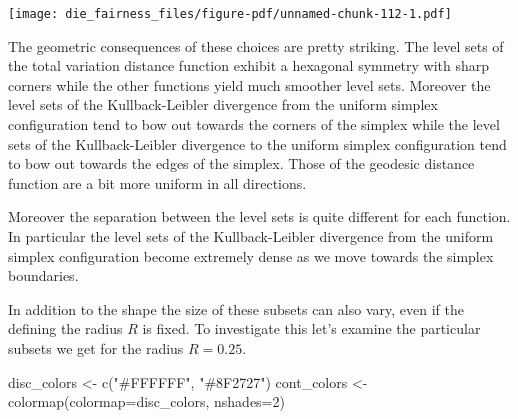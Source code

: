 \documentclass[
  letterpaper,
  DIV=11,
  numbers=noendperiod]{scrartcl}
\newenvironment{Shaded}{\begin{snugshade}}{\end{snugshade}}
\newcommand{\AttributeTok}[1]{\textcolor[rgb]{0.40,0.45,0.13}{#1}}
\newcommand{\DecValTok}[1]{\textcolor[rgb]{0.68,0.00,0.00}{#1}}
\newcommand{\FunctionTok}[1]{\textcolor[rgb]{0.28,0.35,0.67}{#1}}
\newcommand{\NormalTok}[1]{\textcolor[rgb]{0.00,0.23,0.31}{#1}}
\newcommand{\OtherTok}[1]{\textcolor[rgb]{0.00,0.23,0.31}{#1}}
\newcommand{\StringTok}[1]{\textcolor[rgb]{0.13,0.47,0.30}{#1}}
\begin{document}
\texttt{[image: die\_fairness\_files/figure-pdf/unnamed-chunk-112-1.pdf]}

The geometric consequences of these choices are pretty striking. The
level sets of the total variation distance function exhibit a hexagonal
symmetry with sharp corners while the other functions yield much
smoother level sets. Moreover the level sets of the Kullback-Leibler
divergence from the uniform simplex configuration tend to bow out
towards the corners of the simplex while the level sets of the
Kullback-Leibler divergence to the uniform simplex configuration tend to
bow out towards the edges of the simplex. Those of the geodesic distance
function are a bit more uniform in all directions.

Moreover the separation between the level sets is quite different for
each function. In particular the level sets of the Kullback-Leibler
divergence from the uniform simplex configuration become extremely dense
as we move towards the simplex boundaries.

In addition to the shape the size of these subsets can also vary, even
if the defining the radius \(R\) is fixed. To investigate this let's
examine the particular subsets we get for the radius \(R = 0.25\).

\begin{Shaded}
\begin{Highlighting}[]
\NormalTok{disc\_colors }\OtherTok{\textless{}{-}} \FunctionTok{c}\NormalTok{(}\StringTok{"\#FFFFFF"}\NormalTok{, }\StringTok{"\#8F2727"}\NormalTok{)}
\NormalTok{cont\_colors }\OtherTok{\textless{}{-}} \FunctionTok{colormap}\NormalTok{(}\AttributeTok{colormap=}\NormalTok{disc\_colors, }\AttributeTok{nshades=}\DecValTok{2}\NormalTok{)}
\end{Highlighting}
\end{Shaded}
\end{document}
